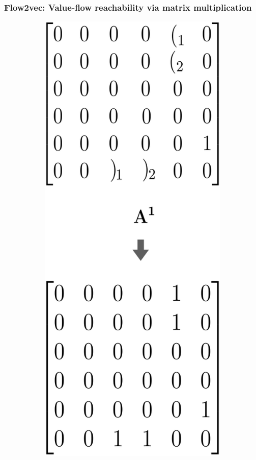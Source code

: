 \documentclass[xcolor=table,english]{beamer}
\begin{document}
\begin{frame}[fragile] \frametitle{Flow2vec: Value-flow reachability via matrix multiplication}
    \begin{figure}[w]
        \centering
        \begin{subfigure}[b]{0.2\textwidth}
            \includegraphics[width=\textwidth]{figures/cfpq_1.png}

\end{subfigure}
\end{figure}
\end{frame}
\end{document}
